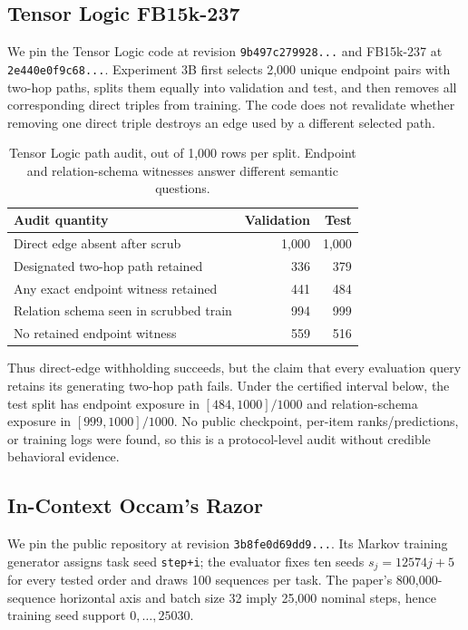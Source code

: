 \subsection{Tensor Logic FB15k-237}

We pin the Tensor Logic code at revision
\texttt{9b497c279928...} and FB15k-237 at
\texttt{2e440e0f9c68...}.  Experiment 3B first selects 2,000 unique endpoint
pairs with two-hop paths, splits them equally into validation and test, and
then removes all corresponding direct triples from training.  The code does
not revalidate whether removing one direct triple destroys an edge used by a
different selected path.

\begin{table}[H]
\caption{Tensor Logic path audit, out of 1,000 rows per split.  Endpoint and
relation-schema witnesses answer different semantic questions.}
\label{tab:tensor-audit}
\centering
\small
\begin{tabular}{lrr}
\toprule
Audit quantity & Validation & Test \\
\midrule
Direct edge absent after scrub & 1,000 & 1,000 \\
Designated two-hop path retained & 336 & 379 \\
Any exact endpoint witness retained & 441 & 484 \\
Relation schema seen in scrubbed train & 994 & 999 \\
No retained endpoint witness & 559 & 516 \\
\bottomrule
\end{tabular}
\end{table}

Thus direct-edge withholding succeeds, but the claim that every evaluation
query retains its generating two-hop path fails.  Under the certified
interval below, the test split has endpoint exposure in
$[484,1000]/1000$ and relation-schema exposure in
$[999,1000]/1000$.  No public checkpoint, per-item ranks/predictions, or
training logs were found, so this is a protocol-level audit without credible
behavioral evidence.

\subsection{In-Context Occam's Razor}

We pin the public repository at revision
\texttt{3b8fe0d69dd9...}.  Its Markov training generator assigns task seed
\texttt{step+i}; the evaluator fixes ten seeds
\(s_j=12574j+5\) for every tested order and draws 100 sequences per task.
The paper's 800,000-sequence horizontal axis and batch size 32 imply 25,000
nominal steps, hence training seed support \(0,\ldots,25030\).

